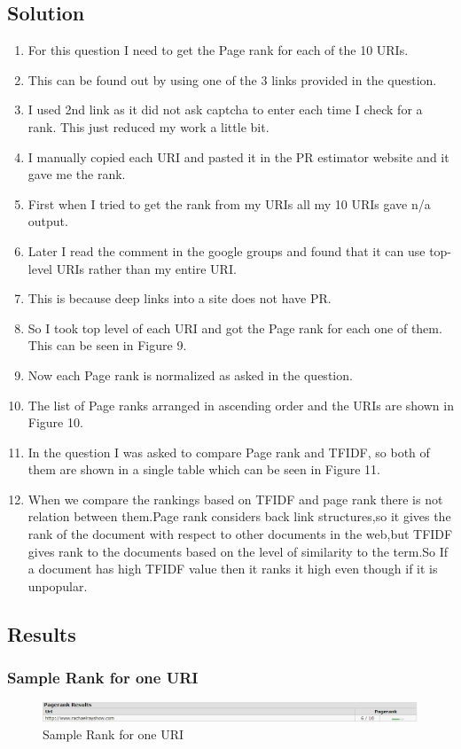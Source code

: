 \subsection{Solution}
\begin{enumerate}

\item For this question I need to get the Page rank for each of the 10 URIs.
\item This can be found out by using one of the 3 links provided in the question.  
\item I used 2nd link as it did not ask captcha to enter each time I check for a rank. This just reduced my work a little bit.
\item I manually copied each URI and pasted it in the PR estimator website and it gave me the rank.
\item First when I tried to get the rank from my URIs all my 10 URIs gave n/a output.
\item Later I read the comment in the google groups and found that it can use top-level URIs rather than my entire URI.
\item This is because deep links into a site does not have PR.
\item So I took top level of each URI and got the Page rank for each one of them. This can be seen in Figure 9.
\item Now each Page rank is normalized as asked in the question. 
\item The list of Page ranks arranged in ascending order and the URIs are shown in Figure 10.
\item In the question I was asked to compare Page rank and TFIDF, so both of them are shown in a single table which can be seen in Figure 11.
\item When we compare the rankings based on TFIDF and page rank there is not relation between them.Page rank considers back link structures,so it gives the rank of the document with respect to other documents in the web,but TFIDF gives rank to the documents based on the level of similarity to the term.So If a document has high TFIDF value then it ranks it high even though if it is unpopular. 
\newpage
\end{enumerate}
\subsection{Results}

\subsubsection{Sample Rank for one URI}
\begin{figure}[ht]    
    \begin{center}
        \includegraphics[scale=0.5]{sample_rank.png}
        \caption{Sample Rank for one URI}
        \label{Sample Rank for one URI}
    \end{center}
\end{figure}


